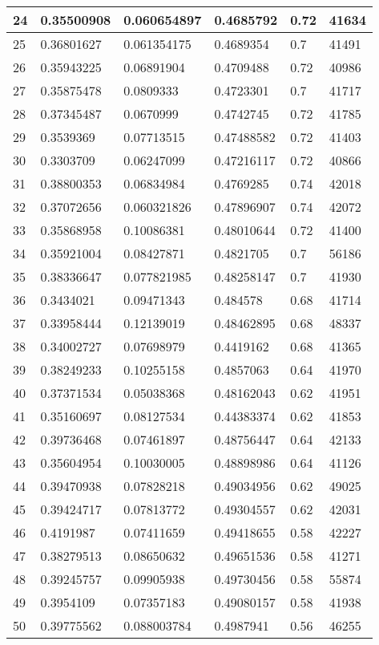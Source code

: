 \begin{longtable}{|l|l|l|l|l|l|}
24 & 0.35500908 & 0.060654897 & 0.4685792 & 0.72 & 41634 \\ \hline 
25 & 0.36801627 & 0.061354175 & 0.4689354 & 0.7 & 41491 \\ \hline 
26 & 0.35943225 & 0.06891904 & 0.4709488 & 0.72 & 40986 \\ \hline 
27 & 0.35875478 & 0.0809333 & 0.4723301 & 0.7 & 41717 \\ \hline 
28 & 0.37345487 & 0.0670999 & 0.4742745 & 0.72 & 41785 \\ \hline 
29 & 0.3539369 & 0.07713515 & 0.47488582 & 0.72 & 41403 \\ \hline 
30 & 0.3303709 & 0.06247099 & 0.47216117 & 0.72 & 40866 \\ \hline 
31 & 0.38800353 & 0.06834984 & 0.4769285 & 0.74 & 42018 \\ \hline 
32 & 0.37072656 & 0.060321826 & 0.47896907 & 0.74 & 42072 \\ \hline 
33 & 0.35868958 & 0.10086381 & 0.48010644 & 0.72 & 41400 \\ \hline 
34 & 0.35921004 & 0.08427871 & 0.4821705 & 0.7 & 56186 \\ \hline 
35 & 0.38336647 & 0.077821985 & 0.48258147 & 0.7 & 41930 \\ \hline 
36 & 0.3434021 & 0.09471343 & 0.484578 & 0.68 & 41714 \\ \hline 
37 & 0.33958444 & 0.12139019 & 0.48462895 & 0.68 & 48337 \\ \hline 
38 & 0.34002727 & 0.07698979 & 0.4419162 & 0.68 & 41365 \\ \hline 
39 & 0.38249233 & 0.10255158 & 0.4857063 & 0.64 & 41970 \\ \hline 
40 & 0.37371534 & 0.05038368 & 0.48162043 & 0.62 & 41951 \\ \hline 
41 & 0.35160697 & 0.08127534 & 0.44383374 & 0.62 & 41853 \\ \hline 
42 & 0.39736468 & 0.07461897 & 0.48756447 & 0.64 & 42133 \\ \hline 
43 & 0.35604954 & 0.10030005 & 0.48898986 & 0.64 & 41126 \\ \hline 
44 & 0.39470938 & 0.07828218 & 0.49034956 & 0.62 & 49025 \\ \hline 
45 & 0.39424717 & 0.07813772 & 0.49304557 & 0.62 & 42031 \\ \hline 
46 & 0.4191987 & 0.07411659 & 0.49418655 & 0.58 & 42227 \\ \hline 
47 & 0.38279513 & 0.08650632 & 0.49651536 & 0.58 & 41271 \\ \hline 
48 & 0.39245757 & 0.09905938 & 0.49730456 & 0.58 & 55874 \\ \hline 
49 & 0.3954109 & 0.07357183 & 0.49080157 & 0.58 & 41938 \\ \hline 
50 & 0.39775562 & 0.088003784 & 0.4987941 & 0.56 & 46255 \\ \hline 
\end{longtable}
